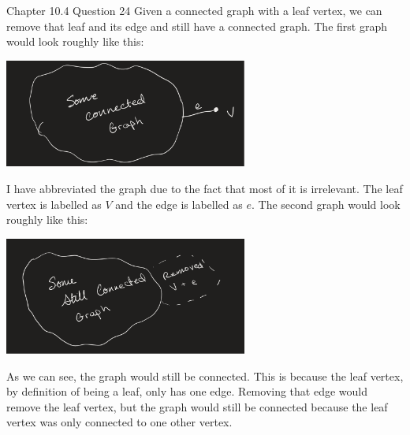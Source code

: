 \documentclass[12pt]{article}
\begin{document}
  \begin{problem}{Chapter 10.4 Question 24}
    Given a connected graph with a leaf vertex, we can remove that leaf and its edge and still have a connected graph.
    The first graph would look roughly like this:
    \begin{center}
      \includegraphics[width=8cm]{connected1.png}
    \end{center}
    I have abbreviated the graph due to the fact that most of it is irrelevant. The leaf vertex is labelled as $V$ and the
    edge is labelled as $e$. The second graph would look roughly like this:
    \begin{center}
      \includegraphics[width=8cm]{connected2.png}
    \end{center}
    As we can see, the graph would still be connected. This is because the leaf vertex, by definition of being a leaf, only
    has one edge. Removing that edge would remove the leaf vertex, but the graph would still be connected because the leaf
    vertex was only connected to one other vertex.
  \end{problem}
\end{document}
